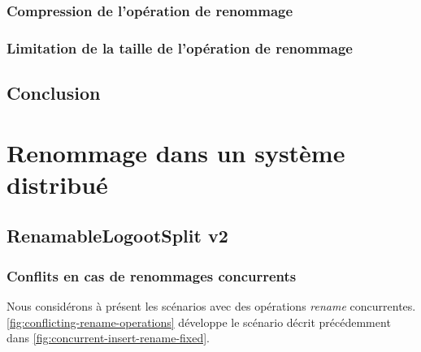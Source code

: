 \documentclass[12pt]{thesul}
\begin{document}
\subsection{Compression de l'opération de renommage}
\subsection{Limitation de la taille de l'opération de renommage}
\section{Conclusion}
% 

\NumberThisInToc
\chapter{Renommage dans un système distribué}
\minitoc
\section{RenamableLogootSplit v2}
\subsection{Conflits en cas de renommages concurrents}

Nous considérons à présent les scénarios avec des opérations \emph{rename} concurrentes.
\autoref{fig:conflicting-rename-operations} développe le scénario décrit précédemment dans \autoref{fig:concurrent-insert-rename-fixed}.
\end{document}
